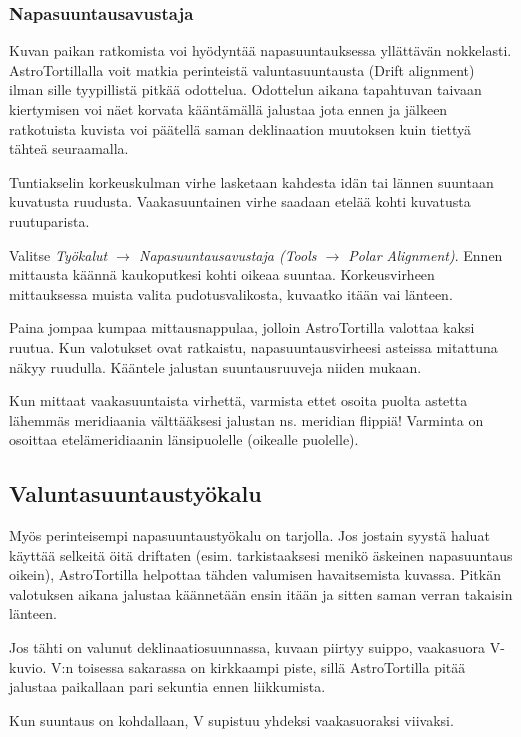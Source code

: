 \documentclass{article}
\begin{document}
\subsubsection{Napasuuntausavustaja}

Kuvan paikan ratkomista voi hyödyntää napasuuntauksessa yllättävän nokkelasti.
AstroTortillalla voit matkia perinteistä valuntasuuntausta (Drift alignment) 
ilman sille tyypillistä pitkää odottelua. Odottelun aikana tapahtuvan taivaan
kiertymisen voi näet korvata kääntämällä jalustaa jota ennen ja jälkeen ratkotuista 
kuvista voi päätellä saman deklinaation muutoksen kuin tiettyä tähteä seuraamalla.

Tuntiakselin korkeuskulman virhe lasketaan kahdesta idän tai lännen suuntaan kuvatusta ruudusta.
Vaakasuuntainen virhe saadaan etelää kohti kuvatusta ruutuparista.

Valitse \emph{Työkalut $\rightarrow$ Napasuuntausavustaja
(Tools $\rightarrow$ Polar Alignment)}. Ennen mittausta käännä kaukoputkesi 
kohti oikeaa suuntaa.  Korkeusvirheen mittauksessa muista valita pudotusvalikosta, kuvaatko itään vai länteen.

Paina jompaa kumpaa mittausnappulaa, jolloin AstroTortilla
valottaa kaksi ruutua. Kun valotukset ovat ratkaistu, napasuuntausvirheesi
asteissa mitattuna näkyy ruudulla. Kääntele jalustan suuntausruuveja niiden mukaan.

Kun mittaat vaakasuuntaista virhettä, varmista ettet osoita puolta astetta
lähemmäs meridiaania välttääksesi jalustan ns. meridian flippiä! Varminta on
osoittaa etelämeridiaanin länsipuolelle (oikealle puolelle).



\subsection{Valuntasuuntaustyökalu}

Myös perinteisempi napasuuntaustyökalu on tarjolla. Jos jostain syystä haluat 
käyttää selkeitä öitä driftaten (esim. tarkistaaksesi menikö äskeinen napasuuntaus oikein),
AstroTortilla helpottaa tähden valumisen havaitsemista kuvassa. Pitkän valotuksen aikana jalustaa käännetään ensin itään ja sitten saman verran takaisin länteen.

Jos tähti on valunut deklinaatiosuunnassa, kuvaan piirtyy suippo,
vaakasuora V-kuvio. V:n toisessa sakarassa on kirkkaampi piste, 
sillä AstroTortilla pitää jalustaa paikallaan pari sekuntia ennen liikkumista.

Kun suuntaus on kohdallaan, V supistuu yhdeksi vaakasuoraksi viivaksi.
\end{document}
